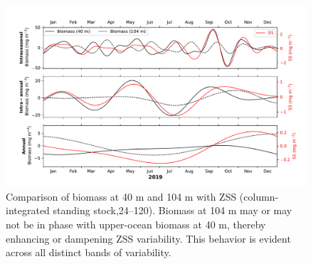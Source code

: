 \documentclass[12pt,a4paper]{article}
\begin{document}
\begin{figure}[htbp]
	\centering
	\includegraphics[width=\textwidth]{./figures/ss_biomass_comparison_intraseasonal_band.pdf} 
	\caption{Comparison of biomass at 40 m and 104 m with ZSS (column-integrated standing stock,24--120). Biomass at 104 m may or may not be in phase with upper-ocean biomass at 40 m, thereby enhancing or dampening ZSS variability. This behavior is evident across all distinct bands of variability.}
	\label{fig:40_104_biomass_zss}
\end{figure}
\end{document}
